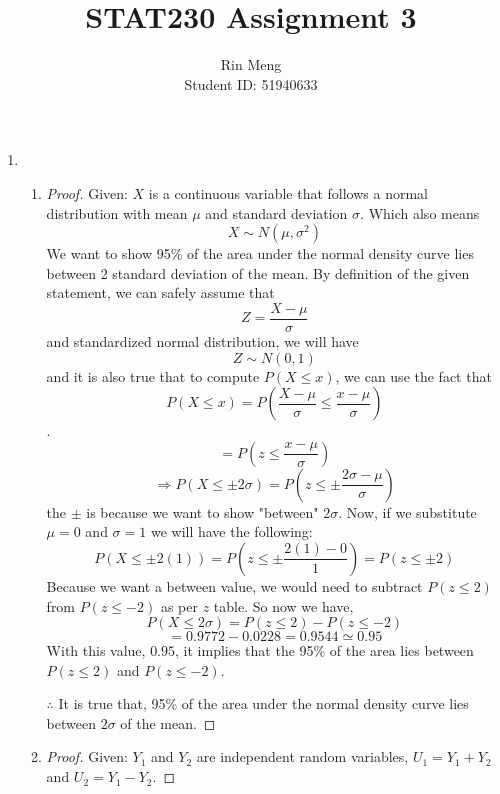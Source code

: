 \documentclass[12pt]{article}
\begin{document}
\title{STAT230 Assignment 3}
\author{Rin Meng \\ Student ID: 51940633}
\maketitle


\begin{enumerate}

	\item 
		\begin{enumerate}
		\item
			\begin{proof}
				Given: $X$ is a continuous variable that follows a normal distribution with mean $\mu$ and standard deviation $\sigma$. Which also means 
				$$X \sim N(\mu, \sigma^2)$$
				We want to show 95\% of the area under the normal density curve lies between 2 standard deviation of the mean. By definition of the given statement, we can safely assume that 
				$$Z = \frac{X - \mu}{\sigma}$$
			and standardized normal distribution, we will have
				$$Z \sim N(0, 1)$$
			and it is also true that to compute $P(X \leq x)$, we can use the fact that 
				$$P(X \leq x) =  P(\frac{X - \mu}{\sigma} \leq \frac{x - \mu}{\sigma})$$.
				$$= P(z \leq \frac{x - \mu}{\sigma})$$
				$$\Rightarrow P(X \leq \pm 2 \sigma) = P(z \leq \pm \frac{2 \sigma - \mu}{\sigma})$$
				the $\pm$ is because we want to show "between" $2\sigma$. Now, if we substitute $\mu = 0$ and $\sigma = 1$ we will have the following:
				$$P(X \leq \pm 2(1)) = P(z \leq \pm \frac{2(1) - 0}{1}) = P(z \leq \pm 2)$$
				Because we want a between value, we would need to subtract $P(z \leq 2)$ from $P(z \leq -2)$ as per $z$ table. So now we have, 
				$$P(X \leq 2\sigma) = P(z \leq 2) - P(z \leq -2)$$
				$$= 0.9772 - 0.0228 = 0.9544 \simeq 0.95$$
				With this value, $0.95$, it implies that the 95\% of the area lies between $P(z \leq 2)$ and $P(z \leq -2)$.
			
				$\therefore$ It is true that, 95\% of the area under the normal density curve lies between $2\sigma$ of the mean.
			\end{proof}
	
		\item
			\begin{proof}
				Given: $Y_1$ and $Y_2$ are independent random variables, $U_1 = Y_1 + Y_2$ and $U_2 = Y_1 - Y_2$.
				

\end{proof}
\end{enumerate}
\end{enumerate}
\end{document}
